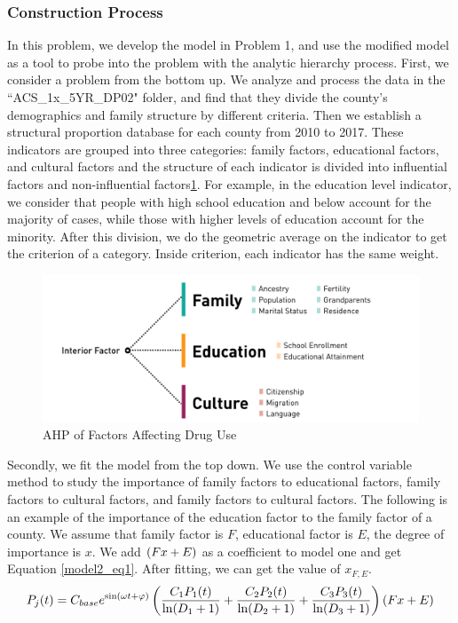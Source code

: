 \documentclass{mcmthesis}
\begin{document}
\subsubsection{Construction Process}
In this problem, we develop the model in Problem 1, and use the modified model as a tool to probe into the problem with the analytic hierarchy process. First, we consider a problem from the bottom up. We analyze and process the data in the ``ACS\_1x\_5YR\_DP02" folder, and find that they divide the county's demographics and family structure by different criteria. Then we establish a structural proportion database for each county from 2010 to 2017. These indicators are grouped into three categories: family factors, educational factors, and cultural factors and the structure of each indicator is divided into influential factors and non-influential factors\ref{model2_layer}. For example, in the education level indicator, we consider that people with high school education and below account for the majority of cases, while those with higher levels of education account for the minority. After this division, we do the geometric average on the indicator to get the criterion of a category. Inside criterion, each indicator has the same weight.
\begin{figure}[h]
	\centering
	\includegraphics[width=15cm]{figure-release/Model2.LayerMap.png}
	\caption{AHP of Factors Affecting Drug Use}\label{model2_layer}
\end{figure}

Secondly, we fit the model from the top down. We use the control variable method to study the importance of family factors to educational factors, family factors to cultural factors, and family factors to cultural factors. The following is an example of the importance of the education factor to the family factor of a county. We assume that family factor is $F$, educational factor is $E$, the degree of importance is $x$. We add $\left( F\*x+E\right) $ as a coefficient to model one and get Equation \eqref{model2_eq1}. After fitting, we can get the value of $x_{F,E}$.
\begin{equation}
P_{j}(t) = C_{base} e^{\sin (\omega t+\varphi)} \left(\frac{C_1 P_1(t)}{\ln (D_1+1)}+\frac{C_2 P_2(t)}{\ln (D_2+1)}+\frac{C_3 P_3(t)}{\ln (D_3+1)}\right)\left( F\*x+E\right)
\label{model2_eq1}
\end{equation}
\end{document}
